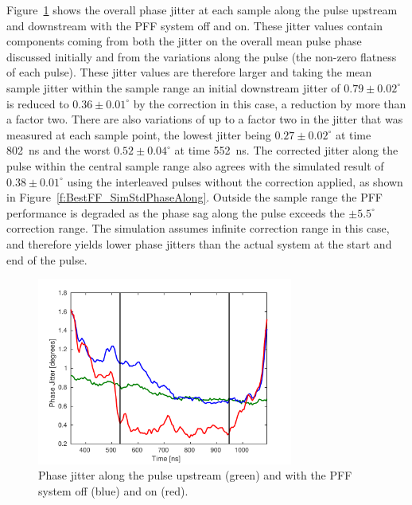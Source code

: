 Figure~\ref{f:BestFF_StdPhaseAlong} shows the overall phase jitter at each sample along the pulse upstream and downstream with the PFF system off and on. These jitter values contain components coming from both the jitter on the overall mean pulse phase discussed initially and from the variations along the pulse (the non-zero flatness of each pulse). These jitter values are therefore larger and taking the mean sample jitter within the sample range an initial downstream jitter of \(0.79\pm0.02^\circ\) is reduced to \(0.36\pm0.01^\circ\) by the correction in this case, a reduction by more than a factor two. There are also variations of up to a factor two in the jitter that was measured at each sample point, the lowest jitter being \(0.27\pm0.02^\circ\) at time 802~ns and the worst \(0.52\pm0.04^\circ\) at time 552~ns. The corrected jitter along the pulse within the central sample range also agrees with the simulated result of \(0.38\pm0.01^\circ\) using the interleaved pulses without the correction applied, as shown in Figure~\ref{f:BestFF_SimStdPhaseAlong}. Outside the sample range the PFF performance is degraded as the phase sag along the pulse exceeds the \(\pm5.5^\circ\) correction range. The simulation assumes infinite correction range in this case, and therefore yields lower phase jitters than the actual system at the start and end of the pulse.

\begin{figure}
  \centering
  \includegraphics[width=0.75\textwidth]{Figures/feedforward/BestFF_StdPhaseAlong}
  \caption{Phase jitter along the pulse upstream (green) and with the PFF system off (blue) and on (red).}
  \label{f:BestFF_StdPhaseAlong}
\end{figure}

